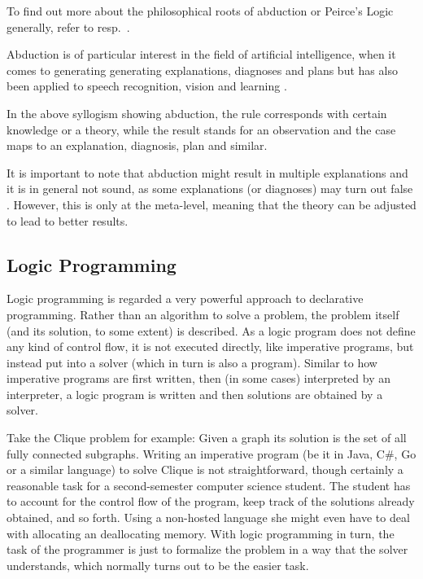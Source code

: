 \documentclass[a4paper]{article}
\begin{document}
To find out more about the philosophical roots of abduction or Peirce's Logic generally, refer to \cite{sep-abduction} resp.~\cite{peirce1940philosophical}.

Abduction is of particular interest in the field of artificial intelligence, when it comes to generating generating explanations, diagnoses and plans but has also been applied to speech recognition, vision and learning \cite[Introductions]{DBLP:journals/logcom/ConsoleDT91,DBLP:journals/tcs/EiterGL97}.

In the above syllogism showing abduction, the rule corresponds with certain knowledge or a theory, while the result stands for an observation and the case maps to an explanation, diagnosis, plan and similar.

It is important to note that abduction might result in multiple explanations and it is in general not sound, as some explanations (or diagnoses) may turn out false \cite{DBLP:journals/tcs/EiterGL97}. However, this is only at the meta-level, meaning that the theory can be adjusted to lead to better results.

\subsection{Logic Programming}
\label{sec:logprog}

Logic programming is regarded a very powerful approach to declarative programming. Rather than an algorithm to solve a problem, the problem itself (and its solution, to some extent) is described. As a logic program does not define any kind of control flow, it is not executed directly, like imperative programs, but instead put into a solver (which in turn is also a program). Similar to how imperative programs are first written, then (in some cases) interpreted by an interpreter, a logic program is written and then solutions are obtained by a solver.

Take the Clique problem for example: Given a graph its solution is the set of all fully connected subgraphs. Writing an imperative program (be it in Java, C\#, Go or a similar language) to solve Clique is not straightforward, though certainly a reasonable task for a second-semester computer science student. The student has to account for the control flow of the program, keep track of the solutions already obtained, and so forth. Using a non-hosted language she might even have to deal with allocating an deallocating memory. With logic programming in turn, the task of the programmer is just to formalize the problem in a way that the solver understands, which normally turns out to be the easier task.
\end{document}
